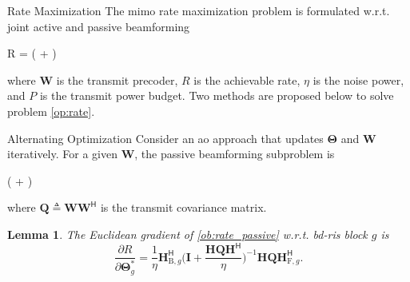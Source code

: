 \documentclass[journal]{IEEEtran}
\newtheorem{lemma}{Lemma}
\begin{document}
\begin{section}{Rate Maximization}
	The \gls{mimo} rate maximization problem is formulated w.r.t. joint active and passive beamforming
	\begin{maxi!}
		{}{R = \log \det \biggl( + \biggr)}{\label{op:rate}}{\label{ob:rate}}
	\end{maxi!}
	where $\mathbf{W}$ is the transmit precoder, $R$ is the achievable rate, $\eta$ is the noise power, and $P$ is the transmit power budget.
	Two methods are proposed below to solve problem \eqref{op:rate}.

	\begin{subsection}{Alternating Optimization}
		Consider an \gls{ao} approach that updates $\mathbf{\Theta}$ and $\mathbf{W}$ iteratively.
		For a given $\mathbf{W}$, the passive beamforming subproblem is
		\begin{maxi!}
			{\scriptstyle{\mathbf{\Theta}}}{\log \det \biggl( + \biggr)}{\label{op:rate_passive}}{\label{ob:rate_passive}}
			\addConstraint{\mathbf{\Theta}_g^\mathsf{H} \mathbf{\Theta}_g=\mathbf{I}, \quad \forall g,}{}{}
		\end{maxi!}
		where $\mathbf{Q} \triangleq \mathbf{W} \mathbf{W}^\mathsf{H}$ is the transmit covariance matrix.
		\begin{lemma}
			The Euclidean gradient of \eqref{ob:rate_passive} w.r.t. \gls{bd}-\gls{ris} block $g$ is
			\begin{equation}
				\frac{\partial R}{\partial \mathbf{\Theta}_g^*} = \frac{1}{\eta} \mathbf{H}_{\mathrm{B},g}^\mathsf{H} \biggl(\mathbf{I} + \frac{\mathbf{H}\mathbf{Q}\mathbf{H}^\mathsf{H}}{\eta}\biggr)^{-1} \mathbf{H} \mathbf{Q} \mathbf{H}_{\mathrm{F},g}^\mathsf{H}.
				\label{eq:rate_gradient}
			\end{equation}
		\end{lemma}


\end{subsection}
\end{section}
\end{document}
